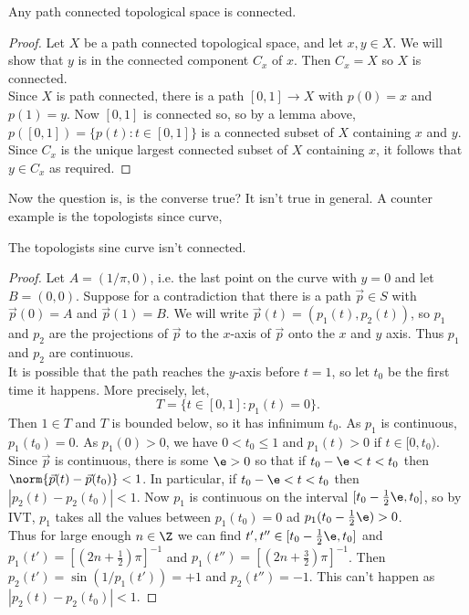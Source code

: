  \begin{nlemma}
   Any path connected topological space is connected.
 \end{nlemma}
 \begin{proof}
   Let $X$ be a path connected topological space, and let $x, y \in X$. We will show that $y$ is in the connected component $C_x$ of $x$. Then $C_x = X$ so $X$ is connected.\\

   \noindent
   Since $X$ is path connected, there is a path $[0, 1] \to X$ with $p(0) = x$ and $p(1) = y$. Now $[0, 1]$ is connected so, so by a lemma above, $p([0, 1]) = \{p(t) : t \in [0, 1]\}$ is a connected subset of $X$ containing $x$ and $y$.\\

   \noindent
   Since $C_x$ is the unique largest connected subset of $X$ containing $x$, it follows that $y \in C_x$ as required.
 \end{proof}

\noindent
 Now the question is, is the converse true? It isn't true in general. A counter example is the topologists since curve,
 \begin{eg}
   The topologists sine curve isn't connected.
 \end{eg}
 \begin{proof}
   Let $A = (1/\pi, 0)$, i.e. the last point on the curve with $y = 0$ and let $B = (0, 0)$. Suppose for a contradiction that there is a path $\vec p \in S$ with $\vec p(0) = A$ and $\vec p(1) = B$. We will write $\vec p(t) = (p_1(t), p_2(t))$, so $p_1$ and $p_2$ are the projections of $\vec p$ to the $x$-axis of $\vec p$ onto the $x$ and $y$ axis. Thus $p_1$ and $p_2$ are continuous. \\
   It is possible that the path reaches the $y$-axis before $t = 1$, so let $t_0$ be the first time it happens. More precisely, let,
   $$ T = \{ t \in [0, 1] : p_1(t) = 0\}. $$
   Then $1 \in T$ and $T$ is bounded below, so it has infinimum $t_0$. As $p_1$ is continuous, $p_1(t_0) = 0$. As $p_1(0) > 0$, we have $0 < t_0 \le 1$ and $p_1(t) > 0$ if $t \in [0, t_0)$.\\
   Since $\vec p$ is continuous, there is some $\e > 0$ so that if $t_0 - \e < t < t_0$ then $\norm{\vec p(t) - \vec p(t_0)} < 1$. In particular, if $t_0 - \e < t < t_0$ then $|p_2(t) - p_2(t_0)| < 1$. Now $p_1$ is continuous on the interval $[t_0 - \frac{1}{2}\e, t_0]$, so by IVT, $p_1$ takes all the values between $p_1(t_0) = 0$ ad $p_1(t_0 - \frac{1}{2}\e) > 0$. \\
   Thus for large enough $n \in \Z$ we can find $t', t'' \in [t_0 - \frac{1}{2}\e, t_0]$ and $p_1(t') = [(2n + \frac{1}{2})\pi]^{-1}$ and $p_1 (t'') = [(2n + \frac{3}{2})\pi]^{-1}$. Then $p_2(t') = \sin (1/p_1(t')) = +1$ and $p_2(t'') = -1$.
   This can't happen as $|p_2(t) - p_2(t_0)| < 1$.
  \end{proof}

